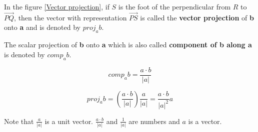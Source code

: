 In the figure \ref{Vector projection}, if $S$ is the foot of the perpendicular from $R$ to $\vec{PQ}$, then the vector with representation $\vec{PS}$ is called the \textbf{vector projection} of \textbf{b} onto \textbf{a} and is denoted by $proj_ab$.

The scalar projection of \textbf{b} onto \textbf{a} which is also called \textbf{component of b along a} is denoted by $comp_ab$.

\begin{equation}
    comp_ab = \frac{a \cdot b}{|a|}
\end{equation}

\begin{equation}
    proj_ab = (\frac{a \cdot b}{|a|}) \frac{a}{|a|} = \frac{a \cdot b}{|a|^2}a
\end{equation}

Note that $\frac{a}{|a|}$ is a unit vector. $\frac{a \cdot b}{|a|}$ and $\frac{1}{|a|}$ are numbers and $a$ is a vector.